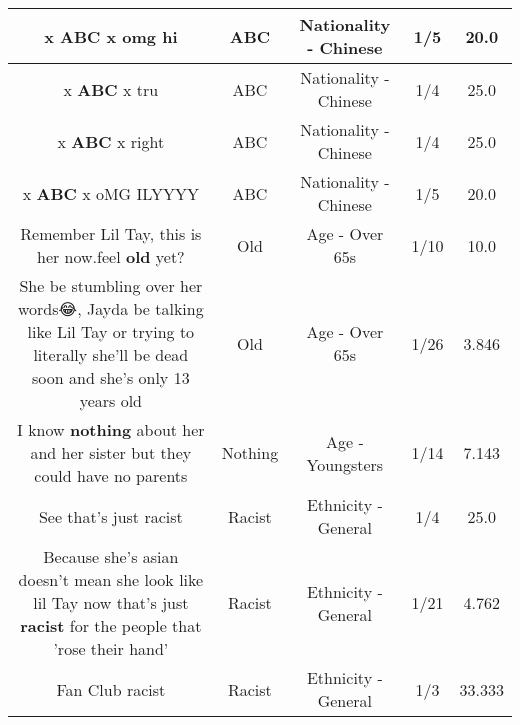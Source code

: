 \documentclass[11pt]{article}
\newlength\mylength
\begin{document}
\begin{center}
\begin{longtable}{|C{.65\mylength}|C{.30\mylength}|C{.12\mylength}|C{.12\mylength}|C{.12\mylength}|}
  \small x \textbf{ABC} x omg hi\normalsize   & ABC & Nationality - Chinese & 1/5 & 20.0 \\  \hline
  \small x \textbf{ABC} x tru\normalsize   & ABC & Nationality - Chinese & 1/4 & 25.0 \\  \hline
  \small x \textbf{ABC} x right\normalsize   & ABC & Nationality - Chinese & 1/4 & 25.0 \\  \hline
  \small x \textbf{ABC} x oMG ILYYYY\normalsize   & ABC & Nationality - Chinese & 1/5 & 20.0 \\  \hline
  \small Remember Lil Tay, this is her now.feel \textbf{old} yet?\normalsize   & Old & Age - Over 65s & 1/10 & 10.0 \\  \hline
  \small She be stumbling over her words😂, Jayda be talking like Lil Tay or trying to literally she'll be dead soon and she's only 13 years old\normalsize   & Old & Age - Over 65s & 1/26 & 3.846 \\  \hline
  \small I know \textbf{nothing} about her and her sister but they could have no parents\normalsize   & Nothing & Age - Youngsters & 1/14 & 7.143 \\  \hline
  \small See that's just racist\normalsize   & Racist & Ethnicity - General & 1/4 & 25.0 \\  \hline
  \small Because she's asian doesn't mean she look like lil Tay  now that's just \textbf{racist} for the people that 'rose their hand'\normalsize   & Racist & Ethnicity - General & 1/21 & 4.762 \\  \hline
  \small Fan Club racist\normalsize   & Racist & Ethnicity - General & 1/3 & 33.333 \\  \hline

\end{longtable}
\end{center}
\end{document}
